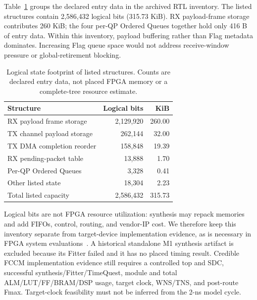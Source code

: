 Table~\ref{tab:eval:logical-state} groups the declared entry data in the
archived RTL inventory.  The listed structures contain 2,586,432 logical bits
(315.73 KiB).  RX payload-frame storage contributes 260 KiB; the four per-QP
Ordered Queues together hold only 416 B of entry data.  Within this inventory,
payload buffering rather than Flag metadata dominates.  Increasing Flag queue
space would not address receive-window pressure or global-retirement blocking.

\begin{table}[tbp]
  \centering
  \caption{Logical state footprint of listed structures.  Counts are declared
  entry data, not placed FPGA memory or a complete-tree resource estimate.}
  \label{tab:eval:logical-state}
  \footnotesize
  \begin{tabular}{p{}rr}
    \toprule
    Structure & Logical bits & KiB \\
    \midrule
    RX payload frame storage & 2,129,920 & 260.00 \\
    TX channel payload storage & 262,144 & 32.00 \\
    TX DMA completion reorder & 158,848 & 19.39 \\
    RX pending-packet table & 13,888 & 1.70 \\
    Per-QP Ordered Queues & 3,328 & 0.41 \\
    Other listed state & 18,304 & 2.23 \\
    \midrule
    Total listed capacity & 2,586,432 & 315.73 \\
    \bottomrule
  \end{tabular}
\end{table}

Logical bits are not FPGA resource utilization: synthesis may repack memories
and add FIFOs, control, routing, and vendor-IP cost.  We therefore keep this
inventory separate from target-device implementation evidence, as is necessary
in FPGA system evaluations~\cite{wang2023cxloverethernet}.  A historical
standalone M1 synthesis artifact is excluded because its Fitter failed and it
has no placed timing result.  Credible FCCM implementation evidence still
requires a controlled top and SDC, successful synthesis/Fitter/TimeQuest,
module and total ALM/LUT/FF/BRAM/DSP usage, target clock, WNS/TNS, and post-route
Fmax.  Target-clock feasibility must not be inferred from the 2-ns model cycle.

